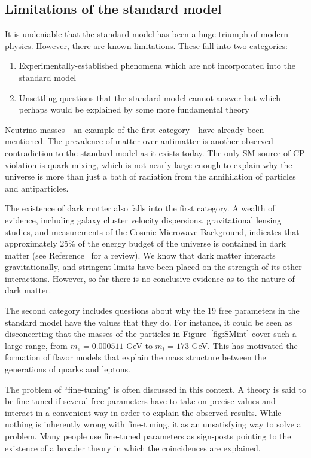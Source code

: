 \subsection{Limitations of the standard model}
\label{sec:SMweakness}
It is undeniable that the standard model has been a huge triumph of modern physics. However, there are known limitations. These fall into two categories: 
\begin{enumerate}
	\item Experimentally-established phenomena which are not incorporated into the standard model
	\item Unsettling questions that the standard model cannot answer but which perhaps would be explained by some more fundamental theory
\end{enumerate}

Neutrino masses---an example of the first category---have already been mentioned. The prevalence of matter over antimatter is another observed contradiction to the standard model as it exists today. The only SM source of CP violation is quark mixing, which is not nearly large enough to explain why the universe is more than just a bath of radiation from the annihilation of particles and antiparticles. 

The existence of dark matter also falls into the first category. A wealth of evidence, including galaxy cluster velocity dispersions, gravitational lensing studies, and measurements of the Cosmic Microwave Background, indicates that approximately 25\% of the energy budget of the universe is contained in dark matter (see Reference~\cite{DarkMatterReview} for a review). We know that dark matter interacts gravitationally, and stringent limits have been placed on the strength of its other interactions. However, so far there is no conclusive evidence as to the nature of dark matter.

The second category includes questions about why the 19 free parameters in the standard model have the values that they do. For instance, it could be seen as disconcerting that the masses of the particles in Figure~\ref{fig:SMint} cover such a large range, from $m_e = 0.000511$ GeV to $m_t = 173$ GeV. This 
has motivated the formation of flavor models that explain the mass structure between the generations of quarks and leptons.

The problem of ``fine-tuning" is often discussed in this context. A theory is said to be fine-tuned if several free parameters have to take on precise values and interact in a convenient way in order to explain the observed results. While nothing is inherently wrong with fine-tuning, it as an unsatisfying way to solve a problem. Many people use fine-tuned parameters as sign-posts pointing to the existence of a broader theory in which the coincidences are explained.

